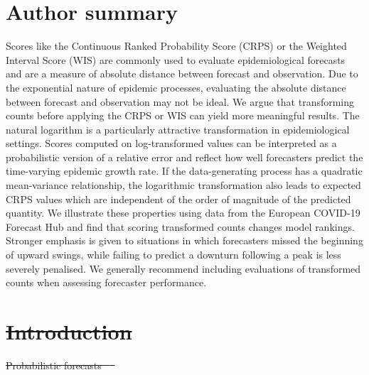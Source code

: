 \documentclass[10pt,letterpaper]{article} %
\providecommand{\DIFaddtex}[1]{{\protect\color{blue}\uwave{#1}}} %
\providecommand{\DIFdeltex}[1]{{\protect\color{red}\sout{#1}}}                      %
\providecommand{\DIFaddbegin}{} %
\providecommand{\DIFaddend}{} %
\providecommand{\DIFdelbegin}{} %
\providecommand{\DIFdelend}{} %
\providecommand{\DIFadd}[1]{\texorpdfstring{\DIFaddtex{#1}}{#1}} %
\providecommand{\DIFdel}[1]{\texorpdfstring{\DIFdeltex{#1}}{}} %
\newcommand{\DIFscaledelfig}{0.5}
\newlength{\DIFdelgraphicswidth} %
\newlength{\DIFdelgraphicsheight} %
\newcommand{\DIFaddincludegraphics}[2][]{{\color{blue}\fbox{\DIFOincludegraphics[#1]{#2}}}} %
\newcommand{\DIFdelincludegraphics}[2][]{%
\sbox{\DIFdelgraphicsbox}{\DIFOincludegraphics[#1]{#2}}%
\settoboxwidth{\DIFdelgraphicswidth}{\DIFdelgraphicsbox} %
\settoboxtotalheight{\DIFdelgraphicsheight}{\DIFdelgraphicsbox} %
\scalebox{\DIFscaledelfig}{%
\parbox[b]{\DIFdelgraphicswidth}{\usebox{\DIFdelgraphicsbox}\\[-\baselineskip] \rule{\DIFdelgraphicswidth}{0em}}\llap{\resizebox{\DIFdelgraphicswidth}{\DIFdelgraphicsheight}{%
\setlength{\unitlength}{\DIFdelgraphicswidth}%
\begin{picture}(1,1)%
\thicklines\linethickness{2pt} %
{\color[rgb]{1,0,0}\put(0,0){\framebox(1,1){}}}%
{\color[rgb]{1,0,0}\put(0,0){\line( 1,1){1}}}%
{\color[rgb]{1,0,0}\put(0,1){\line(1,-1){1}}}%
\end{picture}%
}\hspace*{3pt}}} %
} %
\DeclareRobustCommand{\DIFaddbegin}{\DIFOaddbegin \let\includegraphics\DIFaddincludegraphics} %
\DeclareRobustCommand{\DIFaddend}{\DIFOaddend \let\includegraphics\DIFOincludegraphics} %
\DeclareRobustCommand{\DIFdelbegin}{\DIFOdelbegin \let\includegraphics\DIFdelincludegraphics} %
\DeclareRobustCommand{\DIFdelend}{\DIFOaddend \let\includegraphics\DIFOincludegraphics} %
\begin{document}

\DIFdelend %
\section*{Author summary}
Scores like the Continuous Ranked Probability Score (CRPS) or the Weighted Interval Score (WIS) are commonly used to evaluate epidemiological forecasts and are a measure of absolute distance between forecast and observation. Due to the exponential nature of epidemic processes, evaluating the absolute distance between forecast and observation may not be ideal. We argue that transforming counts before applying the CRPS or WIS can yield more meaningful results. The natural logarithm is a particularly attractive transformation in epidemiological settings. Scores computed on log-transformed values can be interpreted as a probabilistic version of a relative error and reflect how well forecasters predict the time-varying epidemic growth rate. If the data-generating process has a quadratic mean-variance relationship, the logarithmic transformation also leads to expected CRPS values which are independent of the order of magnitude of the predicted quantity. 
We illustrate these properties using data from the European COVID-19 Forecast Hub and find that scoring transformed counts changes model rankings. Stronger emphasis is given to  situations in which forecasters missed the beginning of upward swings, while failing to predict a downturn following a peak is less severely penalised. We generally recommend including evaluations of transformed counts when assessing forecaster performance. 

\DIFdelbegin \section{\DIFdel{Introduction}}
\addtocounter{section}{-1}%
\DIFdelend \DIFaddbegin \linenumbers
\DIFaddend 

\DIFdelbegin \DIFdel{Probabilistic forecasts \mbox{%
\citep{heldProbabilisticForecastingInfectious2017} }\hskip0pt%
}\DIFdelend \DIFaddbegin \section*{\DIFadd{Introduction}}
\end{document}
